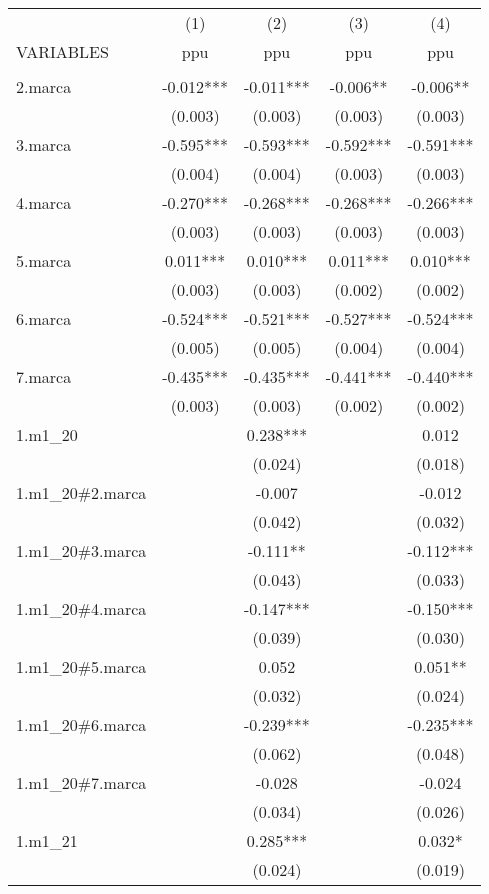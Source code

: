 \begin{tabular}{lcccc} \hline
 & (1) & (2) & (3) & (4) \\
VARIABLES & ppu & ppu & ppu & ppu \\ \hline
 &  &  &  &  \\
2.marca & -0.012*** & -0.011*** & -0.006** & -0.006** \\
 & (0.003) & (0.003) & (0.003) & (0.003) \\
3.marca & -0.595*** & -0.593*** & -0.592*** & -0.591*** \\
 & (0.004) & (0.004) & (0.003) & (0.003) \\
4.marca & -0.270*** & -0.268*** & -0.268*** & -0.266*** \\
 & (0.003) & (0.003) & (0.003) & (0.003) \\
5.marca & 0.011*** & 0.010*** & 0.011*** & 0.010*** \\
 & (0.003) & (0.003) & (0.002) & (0.002) \\
6.marca & -0.524*** & -0.521*** & -0.527*** & -0.524*** \\
 & (0.005) & (0.005) & (0.004) & (0.004) \\
7.marca & -0.435*** & -0.435*** & -0.441*** & -0.440*** \\
 & (0.003) & (0.003) & (0.002) & (0.002) \\
1.m1\_20 &  & 0.238*** &  & 0.012 \\
 &  & (0.024) &  & (0.018) \\
1.m1\_20\#2.marca &  & -0.007 &  & -0.012 \\
 &  & (0.042) &  & (0.032) \\
1.m1\_20\#3.marca &  & -0.111** &  & -0.112*** \\
 &  & (0.043) &  & (0.033) \\
1.m1\_20\#4.marca &  & -0.147*** &  & -0.150*** \\
 &  & (0.039) &  & (0.030) \\
1.m1\_20\#5.marca &  & 0.052 &  & 0.051** \\
 &  & (0.032) &  & (0.024) \\
1.m1\_20\#6.marca &  & -0.239*** &  & -0.235*** \\
 &  & (0.062) &  & (0.048) \\
1.m1\_20\#7.marca &  & -0.028 &  & -0.024 \\
 &  & (0.034) &  & (0.026) \\
1.m1\_21 &  & 0.285*** &  & 0.032* \\
 &  & (0.024) &  & (0.019) \\

\end{tabular}
